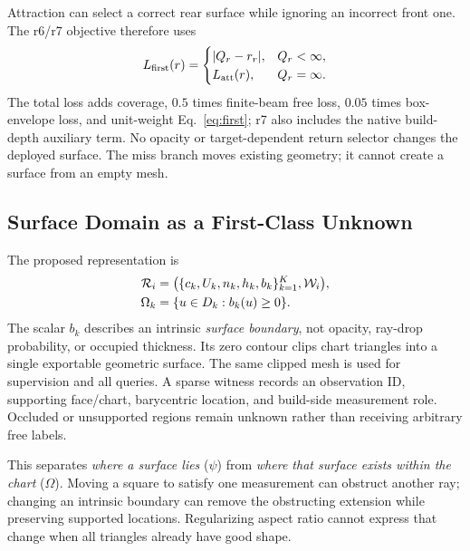 Attraction can select a correct rear surface while ignoring an incorrect front one. The r6/r7 objective therefore uses
\begin{equation}
 L_{\rm first}(r)=
 \begin{cases}|Q_r-r_r|,&Q_r<\infty,\\L_{\rm att}(r),&Q_r=\infty.
 \end{cases}
 \label{eq:first}
\end{equation}
The total loss adds coverage, $0.5$ times finite-beam free loss, $0.05$ times box-envelope loss, and unit-weight Eq.~\ref{eq:first}; r7 also includes the native build-depth auxiliary term. No opacity or target-dependent return selector changes the deployed surface. The miss branch moves existing geometry; it cannot create a surface from an empty mesh.

\subsection{Surface Domain as a First-Class Unknown}
\label{sec:domain}
The proposed representation is
\begin{equation}
\begin{aligned}
 \mathcal R_i&=\bigl(\{c_k,U_k,n_k,h_k,b_k\}_{k=1}^K,\mathcal W_i\bigr),\\
 \Omega_k&=\{u\in D_k:b_k(u)\geq0\}.
\end{aligned}
 \label{eq:domain}
\end{equation}
The scalar $b_k$ describes an intrinsic \emph{surface boundary}, not opacity, ray-drop probability, or occupied thickness. Its zero contour clips chart triangles into a single exportable geometric surface. The same clipped mesh is used for supervision and all queries. A sparse witness records an observation ID, supporting face/chart, barycentric location, and build-side measurement role. Occluded or unsupported regions remain unknown rather than receiving arbitrary free labels.

This separates \emph{where a surface lies} ($\psi$) from \emph{where that surface exists within the chart} ($\Omega$). Moving a square to satisfy one measurement can obstruct another ray; changing an intrinsic boundary can remove the obstructing extension while preserving supported locations. Regularizing aspect ratio cannot express that change when all triangles already have good shape.

